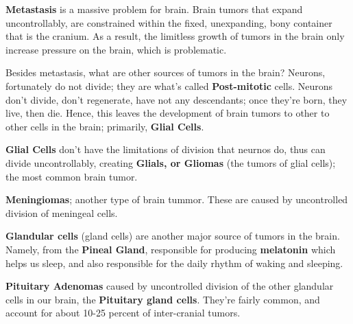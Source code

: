\documentclass[12pt, a4paper]{article}
\begin{document}
\textbf{Metastasis} is a massive problem for brain. Brain tumors that expand 
uncontrollably, are constrained within the fixed, unexpanding, bony container that is the cranium.
As a result, the limitless growth of tumors in the brain only increase pressure on the brain, which is problematic.

Besides metastasis, what are other sources of tumors in the brain? Neurons, fortunately
do not divide; they are what's called \textbf{Post-mitotic} cells. Neurons don't divide,
don't regenerate, have not any descendants; once they're born, they live, then die. Hence,
this leaves the development of brain tumors to other to other cells in the brain; primarily,
\textbf{Glial Cells}.

\textbf{Glial Cells} don't have the limitations of division that neurnos do, thus
can divide uncontrollably, creating \textbf{Glials, or Gliomas} (the tumors of glial cells); the
most common brain tumor.

\textbf{Meningiomas}; another type of brain tummor. These are caused by uncontrolled division of 
meningeal cells.

\textbf{Glandular cells} (gland cells) are another major source of tumors in the brain.
Namely, from the  \textbf{Pineal Gland}, responsible for producing \textbf{melatonin}
which helps us sleep, and also responsible for the daily rhythm of waking and sleeping.

\textbf{Pituitary Adenomas} caused by uncontrolled division of the other glandular cells in our brain,
the \textbf{Pituitary gland cells}. They're fairly common, and account for about 10-25 percent
of inter-cranial tumors.
\end{document}
